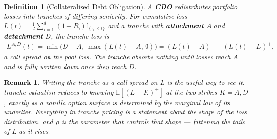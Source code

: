 \documentclass{report}
\theoremstyle{spacedplain}
\theoremstyle{spaceddefinition}
\newtheorem{definition}[theorem]{Definition}
\theoremstyle{spacedremark}
\newtheorem{remark}[theorem]{Remark}
\begin{document}
\begin{definition}[Collateralized Debt Obligation]
A \textbf{CDO} redistributes portfolio losses into tranches of differing seniority. For cumulative loss $L(t) = \frac{1}{d}\sum_{i=1}^d (1-R_i)\mathbb{I}_{\{\tau_i \leq t\}}$ and a tranche with \textbf{attachment} $A$ and \textbf{detachment} $D$, the tranche loss is
\begin{align}
    L^{A,D}(t) = \min\bigl(D-A,\;\max(L(t)-A,\,0)\bigr) = (L(t)-A)^+ - (L(t)-D)^+,
\end{align}
a call spread on the pool loss. The tranche absorbs nothing until losses reach $A$ and is fully written down once they reach $D$.
\end{definition}

\begin{remark}
Writing the tranche as a call spread on $L$ is the useful way to see it: tranche valuation reduces to knowing $\mathbb{E}[(L-K)^+]$ at the two strikes $K = A, D$, exactly as a vanilla option surface is determined by the marginal law of its underlier. Everything in tranche pricing is a statement about the \emph{shape} of the loss distribution, and $\rho$ is the parameter that controls that shape --- fattening the tails of $L$ as it rises.
\end{remark}
\end{document}
